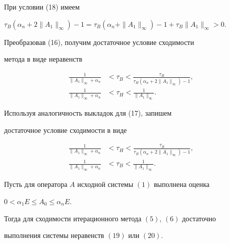 При условии (18) имеем 


$\tau_B(\alpha_n+2\|A_1\|_\infty)-1=\tau_B(\alpha_n+ 


\|A_1\|_\infty)-1+\tau_B\|A_1\|_\infty>0$. 


Преобразовав (16), получим достаточное условие сходимости 


метода в виде неравенств 


\begin{equation} 


\begin{split} 


\frac{1}{\|A_1\|_\infty+\alpha_n}&<\tau_B< 


\frac{\tau_H}{\tau_H(\alpha_n+2\|A_1\|_\infty)-1}, \\ 


\frac{1}{\|A_1\|_\infty+\alpha_n}&<\tau_H< 


\frac{1}{\|A_1\|_\infty}. 


\end{split} 


\end{equation} 


 


Используя аналогичность выкладок для (17), запишем 


достаточное условие сходимости в виде 


\begin{equation} 


\begin{split} 


\frac{1}{\|A_1\|_\infty+\alpha_n}&<\tau_H< 


\frac{\tau_B}{\tau_B(\alpha_n+2\|A_1\|_\infty)-1}, \\ 


\frac{1}{\|A_1\|_\infty+\alpha_n}&<\tau_B<\frac{1}{\|A_1\|_\infty}. 


\end{split} 


\end{equation} 


 


\begin{thm} 


Пусть для оператора $A$ исходной системы $(1)$ выполнена оценка 


$0<\alpha_1E\le A_0\le\alpha_n E$. 


Тогда для сходимости итерационного метода $(5)$, $(6)$ достаточно  


выполнения системы неравенств $(19)$ или $(20)$. 


\end{thm} 


